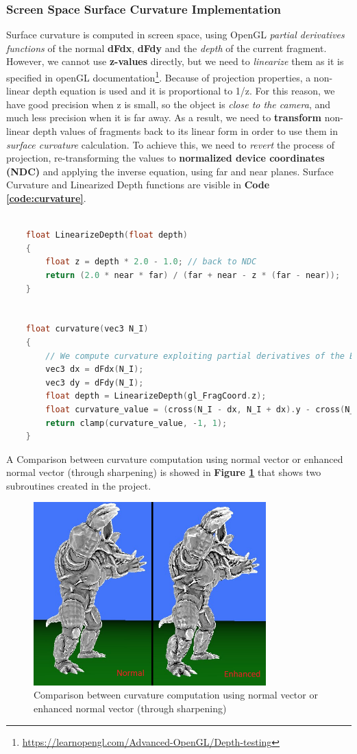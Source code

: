 \subsubsection{Screen Space Surface Curvature Implementation}
Surface curvature is computed in screen space, using OpenGL \textit{partial derivatives functions} of the normal \textbf{dFdx}, \textbf{dFdy} and the \textit{depth} of the current fragment. However, we cannot use \textbf{z-values} directly, but we need to \textit{linearize} them as it is specified in openGL documentation\footnote{\url{https://learnopengl.com/Advanced-OpenGL/Depth-testing}}. \newline
Because of projection properties, a non-linear depth equation is used and it is proportional to 1/z. For this reason, we have good precision when z is small, so the object is \textit{close to the camera}, and much less precision when it is far away. \newline
As a result, we need to \textbf{transform} non-linear depth values of fragments back to its linear form in order to use them in \textit{surface curvature} calculation. To achieve this, we need to \textit{revert} the process of projection, re-transforming the values to \textbf{normalized device coordinates (NDC)} and applying the inverse equation, using far and near planes. \newline
Surface Curvature and Linearized Depth functions are visible in \textbf{Code \ref{code:curvature}}.
\begin{lstlisting}[language=C++, caption=Curvature and LinearizeDepth functions in fragment shader,label={code:curvature}]
	
	float LinearizeDepth(float depth) 
	{
		float z = depth * 2.0 - 1.0; // back to NDC 
		return (2.0 * near * far) / (far + near - z * (far - near));	
	}


	float curvature(vec3 N_I)
	{
		// We compute curvature exploiting partial derivatives of the Enhanced Surface Normal
		vec3 dx = dFdx(N_I);
		vec3 dy = dFdy(N_I);
		float depth = LinearizeDepth(gl_FragCoord.z);
		float curvature_value = (cross(N_I - dx, N_I + dx).y - cross(N_I - dy, N_I + dy).x) * 4.0 / depth;
		return clamp(curvature_value, -1, 1);
	}		
\end{lstlisting}
A Comparison between curvature computation using normal vector or enhanced normal vector (through sharpening) is showed in \textbf{Figure \ref{fig:curvature_comparison}} that shows two subroutines created in the project.
\begin{figure}[h]
	\centering
	\includegraphics[width=0.8\textwidth]{Images/curvature_comparison.png}
	\caption{Comparison between curvature computation using normal vector or enhanced normal vector (through sharpening)}
	\label{fig:curvature_comparison}
\end{figure}